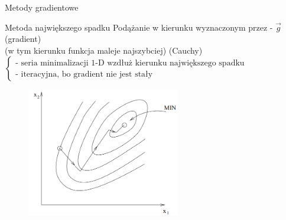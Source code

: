   \begin{frame}{Metody gradientowe}

    \begin{block}{Metoda największego spadku}
      Podążanie w kierunku wyznaczonym przez - $\vec g$ (gradient)
      \\(w tym kierunku funkcja maleje najszybciej) (Cauchy)
      \\$\left\{
        \begin{array}{l}
          \text{- seria minimalizacji 1-D wzdłuż kierunku największego spadku} \\
          \text{- iteracyjna, bo gradient nie jest stały}
	    \end{array}
	  \right.$
  	\end{block}
    \begin{figure}
		\centering
		\includegraphics[height=0.5\textheight ,width=0.6\textwidth]{img/17/high_fall_met_1}
	\end{figure}

  \end{frame}

